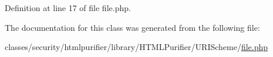 Definition at line 17 of file file.\+php.



The documentation for this class was generated from the following file\+:\begin{DoxyCompactItemize}
\item 
classes/security/htmlpurifier/library/\+H\+T\+M\+L\+Purifier/\+U\+R\+I\+Scheme/\hyperlink{file_8php}{file.\+php}\end{DoxyCompactItemize}
